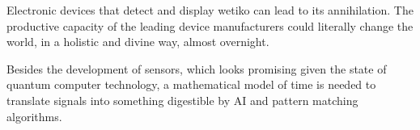 Electronic devices that detect and display wetiko can lead to its annihilation.
The productive capacity of the leading device manufacturers could literally change
the world, in a holistic and divine way, almost overnight.

Besides the development of sensors, which looks promising given the state of quantum
computer technology, a mathematical model of time is needed to translate signals
into something digestible by AI and pattern matching algorithms.


